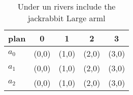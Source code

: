\documentclass[a4paper]{article}
\begin{document}
\begin{table}
\begin{adjustbox}{width=0.6\columnwidth}
\begin{tabular}{|l|l|l|l|l|}
\hline
\textbf{plan} & \multicolumn{1}{c|}{\textbf{0}} & \multicolumn{1}{c|}{\textbf{1}} & \multicolumn{1}{c|}{\textbf{2}} & \multicolumn{1}{c|}{\textbf{3}} \\ \hline
\textbf{$a_0$}  & (0,0) & (1,0) & (2,0) & (3,0) \\ \hline
\textbf{$a_1$}  & (0,0) & (1,0) & (2,0) & (3,0) \\ \hline
\textbf{$a_2$}  & (0,0) & (1,0) & (2,0) & (3,0) \\ \hline
\end{tabular}
\end{adjustbox}
\caption{Under un rivers include the jackrabbit Large arml
}
\end{table}
\end{document}
